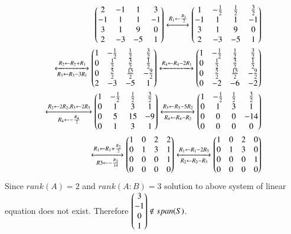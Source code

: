 \documentclass[journal,12pt,twocolumn]{IEEEtran}
\begin{document}
\begin{align}
	\begin{pmatrix}2 & -1 & 1  & 3 \\
	      -1 & 1 & 1  &-1 \\
	      3 & 1 & 9  & 0 \\
	      2 & -3 & -5 & 1\end{pmatrix} 
	\xleftrightarrow[]{R_1 \leftarrow \frac{R_1}{2}}
	\begin{pmatrix}1 & -\frac{1}{2} & \frac{1}{2}& \frac{3}{2} \\
              -1 & 1 & 1  &-1 \\
              3 & 1 & 9  & 0 \\
              2 & -3 & -5  & 1\end{pmatrix}\\
	\xleftrightarrow[R_3 \leftarrow R_3 -3R_1]{R_2 \leftarrow R_2+R_1}
	\begin{pmatrix}1 & -\frac{1}{2} & \frac{1}{2}  & \frac{3}{2} \\
	      0 & \frac{1}{2} & \frac{3}{2}  &\frac{1}{2} \\
	      0 & \frac{5}{2} & \frac{15}{2}  & -\frac{9}{2} \\
              2 & -3 & -5  & 1\end{pmatrix} 
        \xleftrightarrow[]{R_4 \leftarrow R_4-2R_1}
	\begin{pmatrix}1 & -\frac{1}{2} & \frac{1}{2}  & \frac{3}{2} \\
              0 & \frac{1}{2} & \frac{3}{2}  &\frac{1}{2} \\
              0 & \frac{5}{2} & \frac{15}{2}  & -\frac{9}{2} \\
              0 & -2 & -6 & -2\end{pmatrix}\\
	\xleftrightarrow[R_4 \leftarrow -\frac{R_4}{2}]{R_2 \leftarrow 2R_2, R_3 \leftarrow 2R_3}
	\begin{pmatrix}1 & -\frac{1}{2} & \frac{1}{2}  & \frac{3}{2} \\
              0 & 1 & 3  &1 \\
              0 & 5 & 15  & -9 \\
              0 & 1 & 3  & 1\end{pmatrix} 
	\xleftrightarrow[R_4 \leftarrow R_4 - R_2]{R_3 \leftarrow R_3 - 5R_2}
	\begin{pmatrix}1 & -\frac{1}{2} & \frac{1}{2} & \frac{3}{2} \\
              0 & 1 & 3 &1 \\
              0 & 0 & 0 & -14 \\
              0 & 0 & 0 & 0\end{pmatrix} \\
 	\xleftrightarrow[R3 \leftarrow -\frac{R_3}{14} ]{R_1 \leftarrow R_1 + \frac{R_2}{2}}
	\begin{pmatrix}1 & 0  & 2 & 2 \\
              0 & 1 & 3 &1 \\
              0 & 0 & 0 & 1 \\
              0 & 0 & 0 & 0\end{pmatrix}
	\xleftrightarrow[R_2 \leftarrow R_2 - R_3]{R_1 \leftarrow R_1-2R_3}
	\begin{pmatrix}1 & 0  & 2 & 0 \\
              0 & 1 & 3 & 0 \\
              0 & 0 & 0 & 1 \\
              0 & 0 & 0 & 0\end{pmatrix}
\end{align}
Since $rank(A)=2$ and $rank(A:B)=3$ solution to above system of linear equation does not exist.
Therefore $\begin{pmatrix}3\\-1\\0\\1\end{pmatrix} \notin span(S)$.
\end{document}
